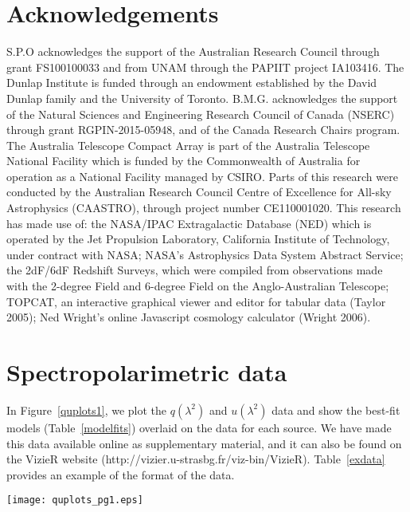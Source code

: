 \documentclass{mnras}
\begin{document}
\section{Acknowledgements}
S.P.O acknowledges the support of the Australian Research Council through grant FS100100033 and from UNAM through the PAPIIT project IA103416. 
The Dunlap Institute is funded through an endowment established by the David Dunlap family and the University of Toronto. B.M.G. acknowledges the support of the Natural Sciences and Engineering Research Council of Canada (NSERC) through grant RGPIN-2015-05948, and of the Canada Research Chairs program. 
The Australia Telescope Compact Array is part of the Australia Telescope National Facility which is funded by the Commonwealth of Australia for operation as a National Facility managed by CSIRO. Parts of this research were conducted by the Australian Research Council Centre of Excellence for All-sky Astrophysics (CAASTRO), through project number CE110001020.
This research has made use of: the NASA/IPAC Extragalactic Database (NED) which is operated by the Jet Propulsion Laboratory, California Institute of Technology, under contract with NASA; NASA's Astrophysics Data System Abstract Service; the 2dF/6dF Redshift Surveys, which were compiled from observations made with the 2-degree Field and 6-degree Field on the Anglo-Australian Telescope; TOPCAT, an interactive graphical viewer and editor for tabular data (Taylor 2005); Ned Wright's online Javascript cosmology calculator (Wright 2006). 






\appendix
\section{Spectropolarimetric data}
\label{sec:quplots}
In Figure~\ref{quplots1}, we plot the $q(\lambda^2)$ and $u(\lambda^2)$ data and show the best-fit models (Table~\ref{modelfits}) overlaid on the data for each source. 
We have made this data available online as supplementary material, and it can also be found on the VizieR website (http://vizier.u-strasbg.fr/viz-bin/VizieR). 
Table~\ref{exdata} provides an example of the format of the data. 


\begin{figure*}
%
\centering
%
\texttt{[image: quplots\_pg1.eps]}
\caption{Plots of $q(\lambda^2)$ (steel-blue, solid) and $u(\lambda^2)$ (dark-salmon, dashed) for all sources, overlaid with the best-fit model. }
%
\label{quplots1}
%
\end{figure*}
\end{document}
